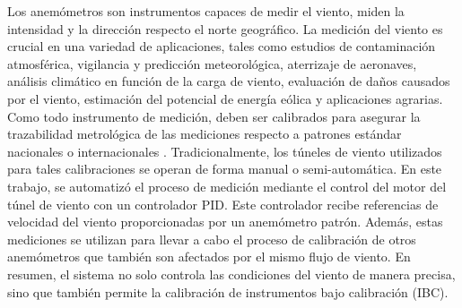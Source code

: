 Los anemómetros son instrumentos capaces de medir el viento, miden la intensidad y la dirección respecto el norte geográfico. La medición del viento es crucial en una variedad de aplicaciones, tales como estudios de contaminación atmosférica, vigilancia y predicción meteorológica, aterrizaje de aeronaves, análisis climático en función de la carga de viento, evaluación de daños causados por el viento, estimación del potencial de energía eólica y aplicaciones agrarias. Como todo instrumento de medición, deben ser calibrados para asegurar la trazabilidad metrológica de las mediciones respecto a patrones estándar nacionales o internacionales \cite{wmoChapter8}. Tradicionalmente, los túneles de viento utilizados para tales calibraciones se operan de forma manual o semi-automática. En este trabajo, se automatizó el proceso de medición mediante el control del motor del túnel de viento con un controlador PID. Este controlador recibe referencias de velocidad del viento proporcionadas por un anemómetro patrón. Además, estas mediciones se utilizan para llevar a cabo el proceso de calibración de otros anemómetros que también son afectados por el mismo flujo de viento. En resumen, el sistema no solo controla las condiciones del viento de manera precisa, sino que también permite la calibración de instrumentos bajo calibración (IBC).

